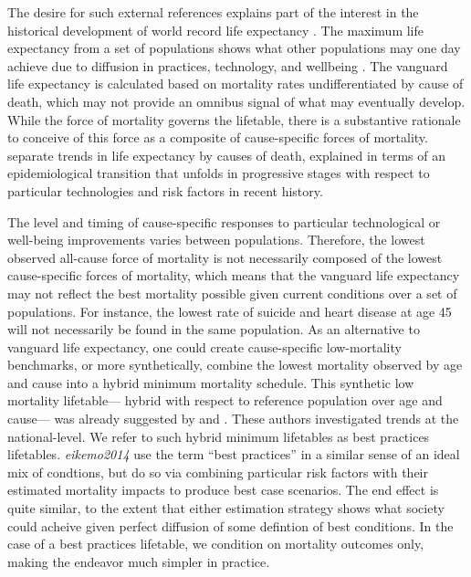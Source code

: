 \documentclass[11pt,oneside,a4paper]{article} %
\begin{document}
The desire for such external references explains part of the interest in the
historical development of world record life expectancy \citep{oeppen2002broken}.
The maximum life expectancy from a set of populations shows what other
populations may one day achieve due to diffusion in practices, technology, and
wellbeing \citep{vallin2010esperance}. The vanguard life expectancy is
calculated based on mortality rates undifferentiated by cause of death, which
may not provide an omnibus signal of what may eventually develop. While the force of
mortality governs the lifetable, there is a substantive rationale to conceive of
this force as a composite of cause-specific forces of mortality.
\citet{vallin2008minimum} separate trends in life expectancy by causes of death,
explained in terms of an epidemiological transition that unfolds in progressive
stages with respect to particular technologies and risk factors in recent
history. 

The level and timing of cause-specific responses to particular
technological or well-being improvements varies between populations. Therefore,
the lowest observed all-cause force of mortality is not necessarily composed of
the lowest cause-specific forces of mortality, which means that the vanguard life
expectancy may not reflect the best mortality possible given current conditions
over a set of populations. For instance, the lowest rate of suicide and heart
disease at age 45 will not necessarily be found in the same population. As an
alternative to vanguard life expectancy, one could create cause-specific
low-mortality benchmarks, or more synthetically, combine the lowest mortality
observed by age and cause into a hybrid minimum mortality schedule. This synthetic low mortality lifetable--- hybrid with respect to reference population over age and cause--- was already suggested by \citet{wunsch1975minimum} and \citet{vallin2008minimum}. These authors investigated trends at the national-level. We refer to such hybrid minimum
lifetables as best practices lifetables. \textit{eikemo2014} use the term ``best
practices'' in a similar sense of an ideal mix of condtions, but do so via
combining particular risk factors with their estimated mortality impacts to
produce best case scenarios. The end effect is quite similar, to the extent that
either estimation strategy shows what society could acheive given perfect
diffusion of some defintion of best conditions. In the case of a best practices
lifetable, we condition on mortality outcomes only, making the endeavor much
simpler in practice.
\end{document}
